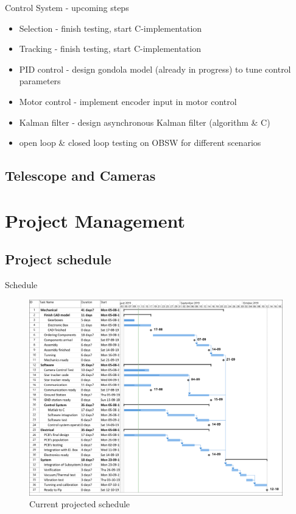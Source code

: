 \documentclass[11pt, aspectratio=169]{beamer}
\begin{document}
\begin{frame}[c]{Control System - upcoming steps}
    \begin{itemize}
        \item Selection - finish testing, start C-implementation
        \item Tracking - finish testing, start C-implementation
        \item PID control - design gondola model (already in progress) to tune control parameters
        \item Motor control - implement encoder input in motor control
        \item Kalman filter - design asynchronous Kalman filter (algorithm \& C)
        \item open loop \& closed loop testing on OBSW for different scenarios
    \end{itemize}
\end{frame}

\subsection{Telescope and Cameras}

\section{Project Management}

	\subsection{Project schedule}
		\begin{frame}{Schedule}
			\begin{figure}
				\centering
				\includegraphics[width=0.98\textwidth, height=0.8\textheight]{figures/Management/Gantt_2.pdf}
				\caption{Current projected schedule}
				\label{img::Gantt}
			\end{figure}
		\end{frame}
\end{document}
